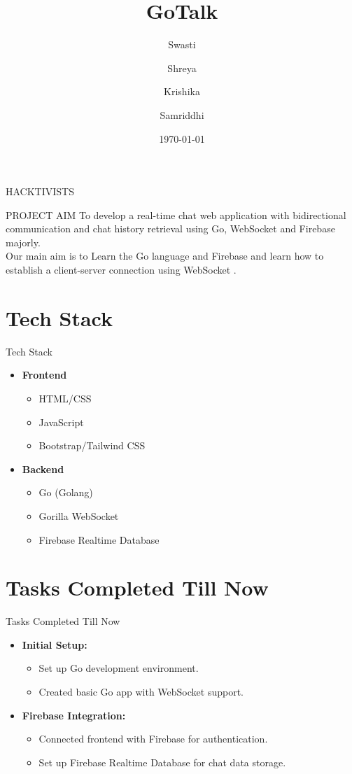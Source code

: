 \documentclass{beamer}
\title{GoTalk}
\author{Swasti \and Shreya \and Krishika \and Samriddhi}
\date{\today}
\begin{document}
\begin{frame}
    \titlepage
    \centering HACKTIVISTS
\end{frame}

\begin{frame}{PROJECT AIM}
    To develop a real-time chat web application with bidirectional communication and chat history retrieval using Go, WebSocket and Firebase majorly.   
    \\
    Our main aim is to Learn the Go language and Firebase and learn how to establish a client-server connection using WebSocket .
\end{frame}

\section{Tech Stack}
\begin{frame}{Tech Stack}
    \begin{itemize}
        \item \textbf{Frontend}
        \begin{itemize}
            \item HTML/CSS
            \item JavaScript
            \item Bootstrap/Tailwind CSS
        \end{itemize}
        \item \textbf{Backend}
        \begin{itemize}
            \item Go (Golang)
            \item Gorilla WebSocket
            \item Firebase Realtime Database
        \end{itemize}
    \end{itemize}
\end{frame}

\section{Tasks Completed Till Now}

\begin{frame}{Tasks Completed Till Now}
    \begin{itemize}
        \item \textbf{Initial Setup:}
        \begin{itemize}
            \item Set up Go development environment.
            \item Created basic Go app with WebSocket support.
        \end{itemize}
        \item \textbf{Firebase Integration:}
        \begin{itemize}
            \item Connected frontend with Firebase for authentication.
            \item Set up Firebase Realtime Database for chat data storage.
        \end{itemize}
    \end{itemize}
\end{frame}
\end{document}
